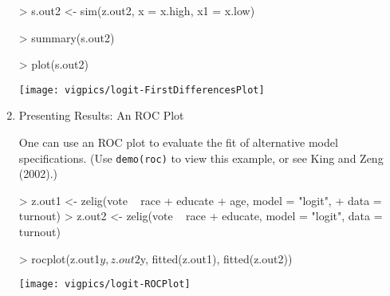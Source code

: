 \documentclass{article}
\begin{document}
\begin{enumerate}
\begin{Schunk}
\begin{Sinput}
> s.out2 <- sim(z.out2, x = x.high, x1 = x.low)
\end{Sinput}
\end{Schunk}
\begin{Schunk}
\begin{Sinput}
> summary(s.out2)
\end{Sinput}
\end{Schunk}
\begin{center}
\begin{Schunk}
\begin{Sinput}
> plot(s.out2)
\end{Sinput}
\end{Schunk}
\texttt{[image: vigpics/logit-FirstDifferencesPlot]}
\end{center} 


\item {Presenting Results: An ROC Plot}  \label{ROC}
  
  One can use an ROC plot to evaluate the fit of alternative model
  specifications.  (Use {\tt demo(roc)} to view this example, or see
  King and Zeng (2002)\nocite{KinZen02}.)  
\begin{Schunk}
\begin{Sinput}
> z.out1 <- zelig(vote ~ race + educate + age, model = "logit", 
+     data = turnout)
> z.out2 <- zelig(vote ~ race + educate, model = "logit", data = turnout)
\end{Sinput}
\end{Schunk}
\begin{center}
\begin{Schunk}
\begin{Sinput}
> rocplot(z.out1$y, z.out2$y, fitted(z.out1), fitted(z.out2))
\end{Sinput}
\end{Schunk}
\texttt{[image: vigpics/logit-ROCPlot]}
\end{center}
\end{enumerate}
\end{document}
